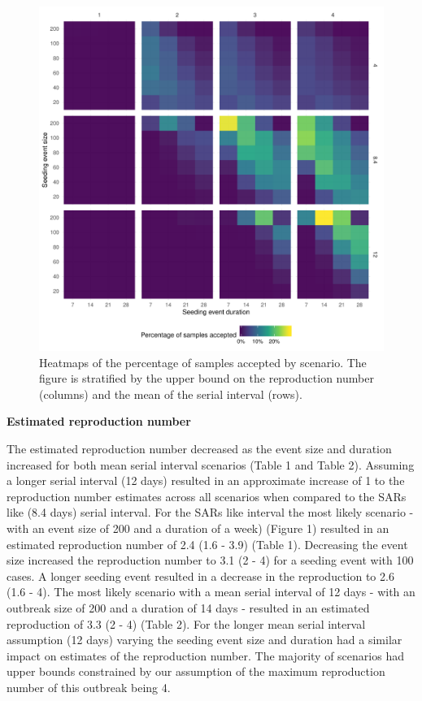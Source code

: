 \documentclass[]{article}
\begin{document}
\begin{figure}
\centering
\includegraphics{figures/plot-probs-1.pdf}
\caption{Heatmaps of the percentage of samples accepted by scenario. The
figure is stratified by the upper bound on the reproduction number
(columns) and the mean of the serial interval (rows).}
\end{figure}

\textbf{Estimated reproduction number}

The estimated reproduction number decreased as the event size and
duration increased for both mean serial interval scenarios (Table 1 and
Table 2). Assuming a longer serial interval (12 days) resulted in an
approximate increase of 1 to the reproduction number estimates across
all scenarios when compared to the SARs like (8.4 days) serial interval.
For the SARs like interval the most likely scenario - with an event size
of 200 and a duration of a week) (Figure 1) resulted in an estimated
reproduction number of 2.4 (1.6 - 3.9) (Table 1). Decreasing the event
size increased the reproduction number to 3.1 (2 - 4) for a seeding
event with 100 cases. A longer seeding event resulted in a decrease in
the reproduction to 2.6 (1.6 - 4). The most likely scenario with a mean
serial interval of 12 days - with an outbreak size of 200 and a duration
of 14 days - resulted in an estimated reproduction of 3.3 (2 - 4) (Table
2). For the longer mean serial interval assumption (12 days) varying the
seeding event size and duration had a similar impact on estimates of the
reproduction number. The majority of scenarios had upper bounds
constrained by our assumption of the maximum reproduction number of this
outbreak being 4.
\end{document}
